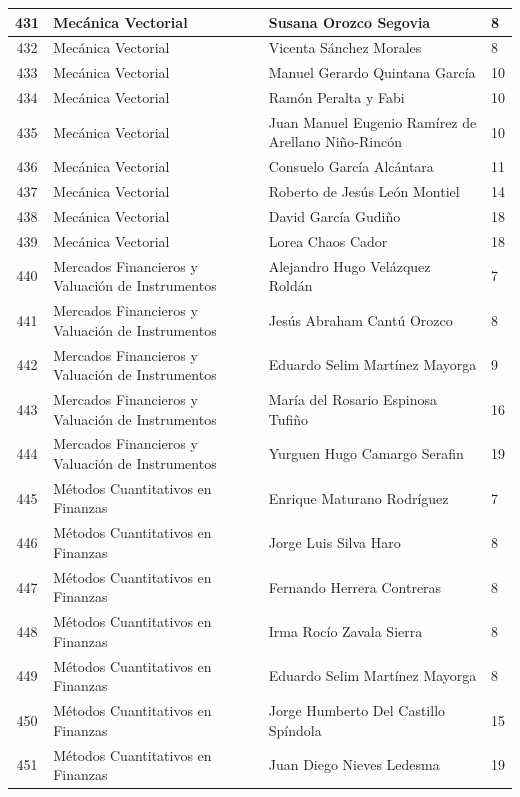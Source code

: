 {\begin{longtable}{|c|p{6.5cm}|p{5cm}|p{1.5cm}|}
  431 & Mecánica Vectorial & Susana Orozco Segovia & 8 \\ \hline 
  432 & Mecánica Vectorial & Vicenta Sánchez Morales & 8 \\ \hline 
  433 & Mecánica Vectorial & Manuel Gerardo Quintana García & 10 \\ \hline 
  434 & Mecánica Vectorial & Ramón Peralta y Fabi & 10 \\ \hline 
  435 & Mecánica Vectorial & Juan Manuel Eugenio Ramírez de Arellano Niño-Rincón & 10 \\ \hline 
  436 & Mecánica Vectorial & Consuelo García Alcántara & 11 \\ \hline 
  437 & Mecánica Vectorial & Roberto de Jesús León Montiel & 14 \\ \hline 
  438 & Mecánica Vectorial & David García Gudiño & 18 \\ \hline 
  439 & Mecánica Vectorial & Lorea Chaos Cador & 18 \\ \hline 
  440 & Mercados Financieros y Valuación de Instrumentos & Alejandro Hugo Velázquez Roldán & 7 \\ \hline 
  441 & Mercados Financieros y Valuación de Instrumentos & Jesús Abraham Cantú Orozco & 8 \\ \hline 
  442 & Mercados Financieros y Valuación de Instrumentos & Eduardo Selim Martínez Mayorga & 9 \\ \hline 
  443 & Mercados Financieros y Valuación de Instrumentos & María del Rosario Espinosa Tufiño & 16 \\ \hline 
  444 & Mercados Financieros y Valuación de Instrumentos & Yurguen Hugo Camargo Serafin & 19 \\ \hline 
  445 & Métodos Cuantitativos en Finanzas & Enrique Maturano Rodríguez & 7 \\ \hline 
  446 & Métodos Cuantitativos en Finanzas & Jorge Luis Silva Haro & 8 \\ \hline 
  447 & Métodos Cuantitativos en Finanzas & Fernando Herrera Contreras & 8 \\ \hline 
  448 & Métodos Cuantitativos en Finanzas & Irma Rocío Zavala Sierra & 8 \\ \hline 
  449 & Métodos Cuantitativos en Finanzas & Eduardo Selim Martínez Mayorga & 8 \\ \hline 
  450 & Métodos Cuantitativos en Finanzas & Jorge Humberto Del Castillo Spíndola & 15 \\ \hline 
  451 & Métodos Cuantitativos en Finanzas & Juan Diego Nieves Ledesma & 19 \\ \hline 

\end{longtable}}
